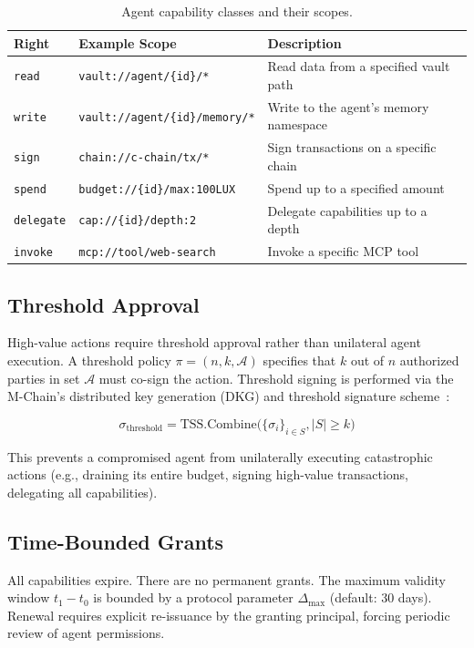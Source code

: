 \begin{table}[H]
\centering
\caption{Agent capability classes and their scopes.}
\label{tab:capabilities}
\begin{tabular}{llp{6cm}}
\toprule
\textbf{Right} & \textbf{Example Scope} & \textbf{Description} \\
\midrule
\texttt{read} & \texttt{vault://agent/\{id\}/*} & Read data from a specified vault path \\
\texttt{write} & \texttt{vault://agent/\{id\}/memory/*} & Write to the agent's memory namespace \\
\texttt{sign} & \texttt{chain://c-chain/tx/*} & Sign transactions on a specific chain \\
\texttt{spend} & \texttt{budget://\{id\}/max:100LUX} & Spend up to a specified amount \\
\texttt{delegate} & \texttt{cap://\{id\}/depth:2} & Delegate capabilities up to a depth \\
\texttt{invoke} & \texttt{mcp://tool/web-search} & Invoke a specific MCP tool \\
\bottomrule
\end{tabular}
\end{table}

\subsection{Threshold Approval}

High-value actions require threshold approval rather than unilateral agent execution. A threshold policy $\pi = (n, k, \mathcal{A})$ specifies that $k$ out of $n$ authorized parties in set $\mathcal{A}$ must co-sign the action. Threshold signing is performed via the M-Chain's distributed key generation (DKG) and threshold signature scheme~\cite{gennaro2020threshold}:

\begin{equation}\label{eq:threshold}
    \sigma_{\text{threshold}} = \text{TSS.Combine}\big(\{\sigma_i\}_{i \in S}, |S| \geq k\big)
\end{equation}

This prevents a compromised agent from unilaterally executing catastrophic actions (e.g., draining its entire budget, signing high-value transactions, delegating all capabilities).

\subsection{Time-Bounded Grants}

All capabilities expire. There are no permanent grants. The maximum validity window $t_1 - t_0$ is bounded by a protocol parameter $\Delta_{\max}$ (default: 30 days). Renewal requires explicit re-issuance by the granting principal, forcing periodic review of agent permissions.

